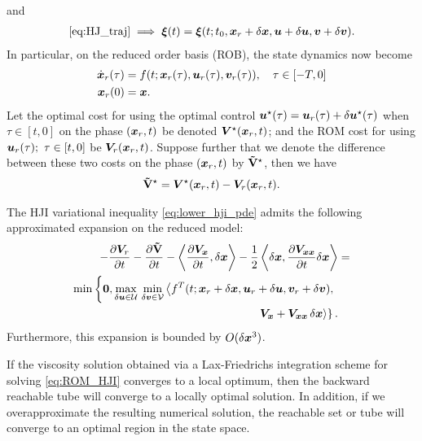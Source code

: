 %
and
%
\begin{align}
	\eqref{eq:HJ_traj} \implies	\bm{\xi}(t) = \bm{\xi}(t; t_0, \bm{x}_r + \delta\bm{x}, 	\bm{u}+\delta\bm{u},\bm{v}+\delta\bm{v}).
\end{align}
%
In particular, on the reduced order basis (ROB), the state dynamics now become
%
\begin{subequations}
	\begin{align}
		\dot{\bm{x}}_r(\tau) &= f(t; \bm{x}_r(\tau), \bm{u}_r(\tau), \bm{v}_r(\tau)), \quad \tau \in \left[-T, 0\right] \\
		\bm{x}_r(0) &= \bm{x}.
	\end{align}
\end{subequations}
%
Let the optimal cost  for using the optimal control $\bm{u}^\star(\tau) = \bm{u}_r(\tau) + \delta \bm{u}^\star(\tau)$ when $\tau \in \left[t, 0\right]$ on the phase $(\bm{x}_r, t)$ be denoted $\bm{V}^\star(\bm{x}_r, t)$; and the ROM cost for using $\bm{u}_r(\tau); \,\, \tau \in \left[t, 0\right]$ be $\bm{V}_r(\bm{x}_r, t)$. Suppose further that we denote  the difference between these two costs on the phase $\left(\bm{x}_r, t\right)$ by $\mathbf{\tilde{V}}^\star$, then we have
%
\begin{align}
	\costdiff^\star =\valuefunc^\star(\state_r, t) -\valuefunc_r(\state_r, t).
	\label{eq:cost_diff}
\end{align}
%
\begin{theorem}
	The HJI variational inequality \cf \eqref{eq:lower_hji_pde} admits the following approximated expansion on the reduced model:
	\begin{align}
		\begin{split} 
			-\frac{\partial \valuefunc_r}{\partial t} -\frac{\partial \costdiff}{\partial t} - \left\langle \dfrac{\partial\valuefunc_{\state}}{\partial t}, \delta\state \right \rangle -  \dfrac{1}{2} \left\langle \delta \state, \dfrac{\partial \valuefunc_{\state\state} }{\partial t}\delta\state \right \rangle &=  \\
			\min \left\{\bm{0},  
			\max_{\delta \control \in \mathcal{U}} \, \min_{\delta \disturb \in \mathcal{V}} \left\langle f^T(t; \state_r + \delta \state, \control_r + \delta \control,  \disturb_r + \delta \disturb), \right. \right. \\
			\left. \left. \valuefunc_{\state} +  \valuefunc_{\state\state}\, \delta \state \right\rangle \right\}. 
		\end{split}
		\label{eq:ROM_HJI}
	\end{align}
	Furthermore, this expansion is bounded by $O(\delta \bm{x}^3)$.
	\label{th:quad_approx}
\end{theorem}
%
\begin{corollary}
	If the viscosity solution obtained via a Lax-Friedrichs integration scheme for solving \eqref{eq:ROM_HJI} converges to a local optimum, then the backward reachable tube will converge to a locally optimal solution. In addition, if we overapproximate the resulting numerical solution, the reachable set or tube will converge to an optimal region in the state space.
\end{corollary}


